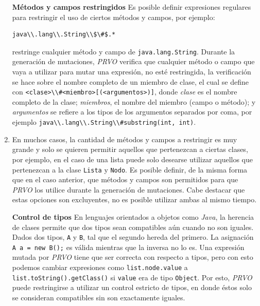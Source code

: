 \begin{enumerate}[leftmargin=.75cm,align=left]
	\item[\textbf{M\'etodos y campos restringidos}] Es posible definir expresiones regulares para restringir el uso de ciertos m\'etodos y campos, por ejemplo:
	\begin{lstlisting}[mathescape=true]
	java\\.lang\\.String\\$\#$.*
	\end{lstlisting}
	restringe cualquier m\'etodo y campo de \lstinline{java.lang.String}. Durante la generaci\'on de mutaciones, \emph{PRVO} verifica que cualquier m\'etodo o campo que vaya a utilizar para mutar una expresi\'on, no est\'e restringida, la verificaci\'on se hace sobre el nombre completo de un miembro de clase, el cual se define con \lstinline{<clase>\\#<miembro>[(<argumentos>)]}, donde \emph{clase} es el nombre completo de la clase; \emph{miembros}, el nombre del miembro (campo o método); y \emph{argumentos} se refiere a los tipos de los argumentos separados por coma, por ejemplo \lstinline{java\\.lang\\.String\\#substring(int, int)}.
	
	\item[\textbf{M\'etodos y campos permitidos}] En muchos casos, la cantidad de m\'etodos y campos a restringir es muy grande y solo se quieren permitir aquellos que pertenezcan a ciertas clases, por ejemplo, en el caso de una lista puede solo desearse utilizar aquellos que pertenezcan a la clase \lstinline{Lista} y \lstinline{Nodo}. Es posible definir, de la misma forma que en el caso anterior, que m\'etodos y campos son permitidos para que \emph{PRVO} los utilice durante la generaci\'on de mutaciones. Cabe destacar que estas opciones son excluyentes, no es posible utilizar ambas al mismo tiempo.
	
	\item[\textbf{Control de tipos}] En lenguajes orientados a objetos como \emph{Java}, la herencia de clases permite que dos tipos sean compatibles a\'un cuando no son iguales. Dados dos tipos, \texttt{A} y \texttt{B}, tal que el segundo hereda del primero. La asignaci\'on \lstinline|A a = new B();| es v\'alida mientras que la inversa no lo es. Una expresi\'on mutada por \emph{PRVO} tiene que ser correcta con respecto a tipos, pero con esto podemos cambiar expresiones como \lstinline|list.node.value| a \lstinline|list.toString().getClass()| si \texttt{value} era de tipo \texttt{Object}. Por esto, \emph{PRVO} puede restringirse a utilizar un control estricto de tipos, en donde \'estos solo se consideran compatibles sin son exactamente iguales.
	

\end{enumerate}
